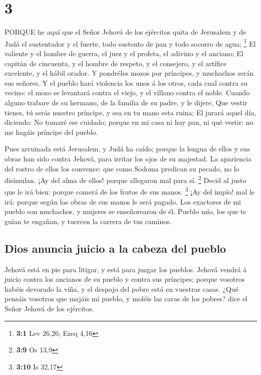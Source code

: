 \hypertarget{section-2}{%
\section{3}\label{section-2}}

 PORQUE he aquí que el Señor Jehová de los ejércitos quita
de Jerusalem y de Judá el sustentador y el fuerte, todo sustento de pan
y todo socorro de agua; \footnote{\textbf{3:1} Lev 26,26; Ezeq 4,16}
 El valiente y el hombre de guerra, el juez y el profeta, el
adivino y el anciano;  El capitán de cincuenta, y el hombre
de respeto, y el consejero, y el artífice excelente, y el hábil orador.
 Y pondréles mozos por príncipes, y muchachos serán sus
señores.  Y el pueblo hará violencia los unos á los otros,
cada cual contra su vecino: el mozo se levantará contra el viejo, y el
villano contra el noble.  Cuando alguno trabare de su
hermano, de la familia de su padre, y le dijere, Que vestir tienes, tú
serás nuestro príncipe, y sea en tu mano esta ruina;  El
jurará aquel día, diciendo: No tomaré ese cuidado; porque en mi casa ni
hay pan, ni qué vestir: no me hagáis príncipe del pueblo.

 Pues arruinada está Jerusalem, y Judá ha caído; porque la
lengua de ellos y sus obras han sido contra Jehová, para irritar los
ojos de su majestad.  La apariencia del rostro de ellos los
convence: que como Sodoma predican su pecado, no lo disimulan. ¡Ay del
alma de ellos! porque allegaron mal para sí. \footnote{\textbf{3:9} Os
  13,9}  Decid al justo que le irá bien: porque comerá de
los frutos de sus manos. \footnote{\textbf{3:10} Is 32,17} 
¡Ay del impío! mal le irá: porque según las obras de sus manos le será
pagado.  Los exactores de mi pueblo son muchachos, y
mujeres se enseñorearon de él. Pueblo mío, los que te guían te engañan,
y tuercen la carrera de tus caminos.

\hypertarget{dios-anuncia-juicio-a-la-cabeza-del-pueblo}{%
\subsection{Dios anuncia juicio a la cabeza del
pueblo}\label{dios-anuncia-juicio-a-la-cabeza-del-pueblo}}

 Jehová está en pie para litigar, y está para juzgar los
pueblos.  Jehová vendrá á juicio contra los ancianos de su
pueblo y contra sus príncipes; porque vosotros habéis devorado la viña,
y el despojo del pobre está en vuestras casas.  ¿Qué
pensáis vosotros que majáis mi pueblo, y moléis las caras de los pobres?
dice el Señor Jehová de los ejércitos.

